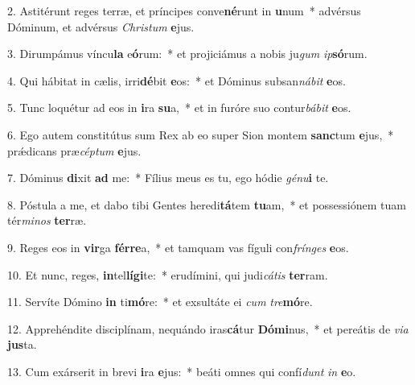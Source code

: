 2. Astitérunt reges terræ, et príncipes conve\textbf{né}runt in \textbf{u}num~*  advérsus Dóminum, et advérsus \textit{Chris}\textit{tum} \textbf{e}jus.\

3. Dirumpámus víncu\textbf{la} e\textbf{ó}rum:~*  et projiciámus a nobis ju\textit{gum} \textit{ip}\textbf{só}rum.\

4. Qui hábitat in cælis, irri\textbf{dé}bit \textbf{e}os:~*  et Dóminus subsan\textit{ná}\textit{bit} \textbf{e}os.\

5. Tunc loquétur ad eos in \textbf{i}ra \textbf{su}a,~*  et in furóre suo contur\textit{bá}\textit{bit} \textbf{e}os.\

6. Ego autem constitútus sum Rex ab eo super Sion montem \textbf{sanc}tum \textbf{e}jus,~*  prǽdicans præ\textit{cép}\textit{tum} \textbf{e}jus.\

7. Dóminus \textbf{di}xit \textbf{ad} me:~*  Fílius meus es tu, ego hódie \textit{gé}\textit{nu}\textbf{i} te.\

8. Póstula a me, et dabo tibi Gentes heredi\textbf{tá}tem \textbf{tu}am,~*  et possessiónem tuam tér\textit{mi}\textit{nos} \textbf{ter}ræ.\

9. Reges eos in \textbf{vir}ga \textbf{fér}\textbf{re}a,~*  et tamquam vas fíguli con\textit{frín}\textit{ges} \textbf{e}os.\

10. Et nunc, reges, \textbf{in}tel\textbf{lí}\textbf{gi}te:~*  erudímini, qui judi\textit{cá}\textit{tis} \textbf{ter}ram.\

11. Servíte Dómino \textbf{in} ti\textbf{mó}re:~*  et exsultáte ei \textit{cum} \textit{tre}\textbf{mó}re.\

12. Apprehéndite disciplínam, nequándo iras\textbf{cá}tur \textbf{Dó}\textbf{mi}nus,~*  et pereátis de \textit{vi}\textit{a} \textbf{jus}ta.\

13. Cum exárserit in brevi \textbf{i}ra \textbf{e}jus:~*  beáti omnes qui confí\textit{dunt} \textit{in} \textbf{e}o.\

